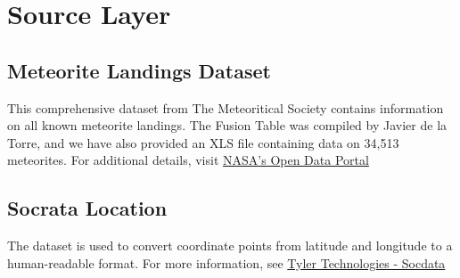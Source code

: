 \documentclass[conference]{IEEEtran}
\begin{document}
	\section{Source Layer}
	
	\subsection{Meteorite Landings Dataset}
	\label{subsec:meteorite landings data set}
	This comprehensive dataset from The Meteoritical Society contains information on all known meteorite landings. The Fusion Table was compiled by Javier de la Torre, and we have also provided an XLS file containing data on 34,513 meteorites. For additional details, visit \href{https://data.nasa.gov/Space-Science/Meteorite-Landings/gh4g-9sfh/about_data}{NASA's Open Data Portal}
		
	\subsection{Socrata Location}
	\label{subsec:socrata_dataset}
	The dataset is used to convert coordinate points from latitude and longitude to a human-readable format. For more information, see 
	\href{https://dev.socrata.com/docs/datatypes/location.html#}{Tyler Technologies - Socdata}
				
\end{document}

